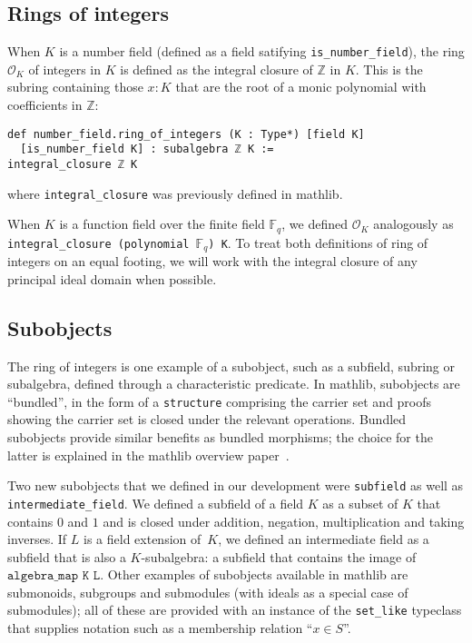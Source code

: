 \documentclass[sn-mathphys]{sn-jnl}%
\newcommand{\lean}[1]{\texttt{#1}\xspace}
\newcommand*{\OK}[1][K]{\mathcal{O}_{#1}}
\newcommand*{\Fq}[1][q]{\mathbb{F}_{#1}}
\newcommand{\mathlib}{\textsf{mathlib}\xspace}
\renewcommand{\Z}{\mathbb{Z}}
\begin{document}
\subsection{Rings of integers} \label{sec:ring-of-integers}

When $K$ is a number field (defined as a field satifying \lean{is\_number\_field}), the ring $\OK$ of integers in $K$ is defined as the integral closure of $\Z$ in $K$.
This is the subring containing those $x : K$ that are the root of a monic polynomial with coefficients in $\Z$:
\begin{lstlisting}
def number_field.ring_of_integers (K : Type*) [field K]
  [is_number_field K] : subalgebra ℤ K :=
integral_closure ℤ K
\end{lstlisting}
where \lean{integral\_closure} was previously defined in \mathlib.

When $K$ is a function field over the finite field $\Fq$, we defined $\OK$ analogously as \lean{integral\_closure (polynomial $\Fq$) K}.
To treat both definitions of ring of integers on an equal footing,
we will work with the integral closure of any principal ideal domain when possible.

\subsection{Subobjects} \label{sec:subobjects}

The ring of integers is one example of a subobject, such as a subfield, subring or subalgebra, defined through a characteristic predicate.
In \mathlib, subobjects are ``bundled'', in the form of a \lean{structure} comprising the carrier set and proofs showing the carrier set is closed under the relevant operations.
Bundled subobjects provide similar benefits as bundled morphisms; the choice for the latter is explained in the \mathlib overview paper~\cite{mathlib}.

Two new subobjects that we defined in our development were \lean{subfield} as well as \lean{intermediate\_field}. We defined a subfield of a field $K$ as a subset of $K$ that contains $0$ and $1$ and is closed under addition, negation, multiplication and taking inverses.
If $L$ is a field extension of~$K$, we defined an intermediate field as a subfield that is also a $K$-subalgebra: a subfield that contains the image of $\lean{algebra\_map K L}$.
Other examples of subobjects available in \mathlib are submonoids, subgroups and submodules (with ideals as a special case of submodules);
all of these are provided with an instance of the \lean{set\_like} typeclass that supplies notation such as a membership relation ``$x \in S$''.
\end{document}
